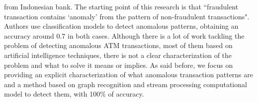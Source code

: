 from Indonesian bank. The starting point of this research is that ``fraudulent transaction contains ‘anomaly’ from the pattern of non-fraudulent transactions". Authors use classification models to detect anomalous patterns, obtaining an accuracy around 0.7 in both cases. Although there is a lot of work tackling the problem of detecting anomalous ATM transactions, most of them based on artificial intelligence techniques, there is not a clear characterization of the problem and what to solve it means or implies. As said before, we focus on providing an explicit characterization of what anomalous transaction  patterns are and a method  based on graph recognition and stream processing  computational model to detect them, with 100\% of accuracy.
